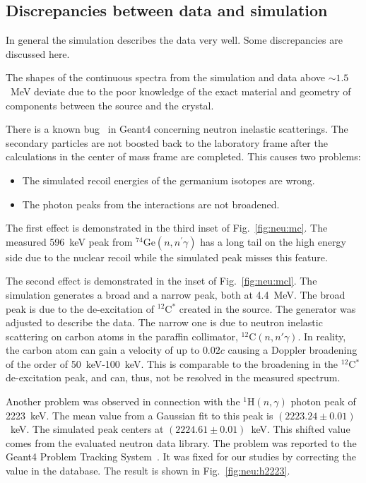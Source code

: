 \subsection{Discrepancies between data and simulation}
\label{sec:neu:dine}
In general the simulation describes the data very well. Some discrepancies are discussed here.

The shapes of the continuous spectra from the simulation and data above $\sim 1.5$~MeV deviate due to the poor knowledge of the exact material and geometry of components between the source and the crystal.

There is a known bug~\cite{g4bug1} in Geant4 concerning neutron
inelastic scatterings. The secondary particles are not boosted back to
the laboratory frame after the calculations in the center of mass
frame are completed. This causes two problems:
\begin{itemize}
\item The simulated recoil energies of the germanium isotopes are
  wrong.
\item The photon peaks from the interactions are not broadened.
\end{itemize}

The first effect is demonstrated in the third inset of Fig.~\ref{fig:neu:mc}. The measured 596~keV peak from $^{74}$Ge$(n,n^\prime\gamma)$ has a long tail on the high energy side due to the nuclear recoil while the simulated peak misses this feature.

The second effect is demonstrated in the inset of Fig.~\ref{fig:neu:mcl}.  The simulation generates a broad and a narrow peak, both at 4.4~MeV.  The broad peak is due to the de-excitation of $^{12}$C$^{*}$ created in the source. The generator was adjusted to describe the data. The narrow one is due to neutron inelastic scattering on carbon atoms in the paraffin collimator, $^{12}$C$(n,n'\gamma)$. In reality, the carbon atom can gain a velocity of up to $0.02c$ causing a Doppler broadening of the order of 50~keV-100~keV. This is comparable to the broadening in the $^{12}$C$^{*}$ de-excitation peak, and can, thus, not be resolved in the measured spectrum.

Another problem was observed in connection with the $^{1}$H$(n,\gamma)$ photon peak of 2223~keV. The mean value from a Gaussian fit to this peak is $(2223.24 \pm 0.01)$~keV. The simulated peak centers at $(2224.61 \pm 0.01)$~keV. This shifted value comes from the evaluated neutron data library. The problem was reported to the Geant4 Problem Tracking System~\cite{g4bug2}. It was fixed for our studies by correcting the value in the database. The result is shown in Fig.~\ref{fig:neu:h2223}.

